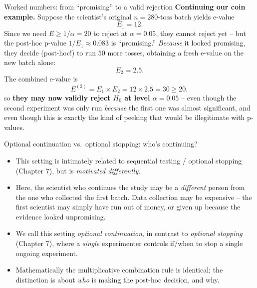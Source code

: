 \documentclass[aspectratio=169,10pt]{beamer}
\begin{document}
\begin{frame}{Worked numbers: from ``promising'' to a valid rejection}
  \textbf{Continuing our coin example.} Suppose the scientist's original
  $n=280$-toss batch yields e-value
  \[
    E_1 = 12.
  \]
  Since we need $E\ge 1/\alpha = 20$ to reject at $\alpha=0.05$, they cannot
  reject yet -- but the post-hoc p-value $1/E_1\approx 0.083$ is
  ``promising.'' \emph{Because} it looked promising, they decide (post-hoc!)
  to run $50$ more tosses, obtaining a fresh e-value on the new batch alone:
  \[
    E_2 = 2.5.
  \]
  The combined e-value is
  \[
    E^{(2)} = E_1\times E_2 = 12\times 2.5 = 30 \ge 20,
  \]
  so \textbf{they may now validly reject $H_0$ at level $\alpha=0.05$} --
  even though the second experiment was only run \emph{because} the first
  one was almost significant, and even though this is exactly the kind of
  peeking that would be illegitimate with p-values.
\end{frame}

\begin{frame}{Optional continuation vs.\ optional stopping: who's continuing?}
  \begin{itemize}
    \item This setting is intimately related to sequential testing /
    optional stopping (Chapter 7), but is \emph{motivated differently}.
    \item Here, the scientist who continues the study may be a
    \emph{different} person from the one who collected the first batch.
    Data collection may be expensive -- the first scientist may simply have
    run out of money, or given up because the evidence looked unpromising.
    \item We call this setting \emph{optional continuation}, in contrast to
    \emph{optional stopping} (Chapter 7), where a \emph{single} experimenter
    controls if/when to stop a single ongoing experiment.
    \item Mathematically the multiplicative combination rule is identical;
    the distinction is about \emph{who} is making the post-hoc decision, and
    why.
  \end{itemize}
\end{frame}
\end{document}
